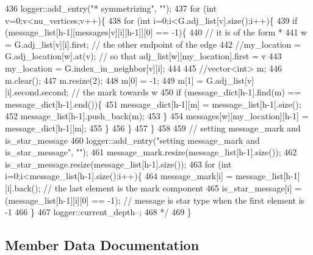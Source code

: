 \begin{DoxyCode}
436 \textcolor{comment}{  logger::add\_entry("* symmetrizing", "");}
437 \textcolor{comment}{  for (int v=0;v<nu\_vertices;v++)\{}
438 \textcolor{comment}{    for (int i=0;i<G.adj\_list[v].size();i++)\{}
439 \textcolor{comment}{      if (message\_list[h-1][messages[v][i][h-1]][0] == -1)\{}
440 \textcolor{comment}{        // it is of the form *}
441 \textcolor{comment}{        w = G.adj\_list[v][i].first; // the other endpoint of the edge}
442 \textcolor{comment}{        //my\_location = G.adj\_location[w].at(v); // so that adj\_list[w][my\_location].first = v}
443 \textcolor{comment}{        my\_location = G.index\_in\_neighbor[v][i];}
444 \textcolor{comment}{}
445 \textcolor{comment}{        //vector<int> m;}
446 \textcolor{comment}{        m.clear();}
447 \textcolor{comment}{        m.resize(2);}
448 \textcolor{comment}{        m[0] = -1;}
449 \textcolor{comment}{        m[1] = G.adj\_list[v][i].second.second; // the mark towards w}
450 \textcolor{comment}{        if (message\_dict[h-1].find(m) == message\_dict[h-1].end())\{}
451 \textcolor{comment}{          message\_dict[h-1][m] = message\_list[h-1].size();}
452 \textcolor{comment}{          message\_list[h-1].push\_back(m);}
453 \textcolor{comment}{        \}}
454 \textcolor{comment}{        messages[w][my\_location][h-1] = message\_dict[h-1][m];}
455 \textcolor{comment}{      \}}
456 \textcolor{comment}{    \}}
457 \textcolor{comment}{  \}}
458 \textcolor{comment}{}
459 \textcolor{comment}{  // setting message\_mark and is\_star\_message}
460 \textcolor{comment}{  logger::add\_entry("setting message\_mark and is\_star\_message", "");}
461 \textcolor{comment}{  message\_mark.resize(message\_list[h-1].size());}
462 \textcolor{comment}{  is\_star\_message.resize(message\_list[h-1].size());}
463 \textcolor{comment}{  for (int i=0;i<message\_list[h-1].size();i++)\{}
464 \textcolor{comment}{    message\_mark[i] = message\_list[h-1][i].back(); // the last element is the mark component}
465 \textcolor{comment}{    is\_star\_message[i] = (message\_list[h-1][i][0] == -1); // message is star type when the first element is
       -1}
466 \textcolor{comment}{  \}}
467 \textcolor{comment}{  logger::current\_depth--;}
468 \textcolor{comment}{  */}
469 \}
\end{DoxyCode}


\subsection{Member Data Documentation}
\mbox{\label{classgraph__message_a45dfd061b7bc73572e5132fbf66efd55}} 
